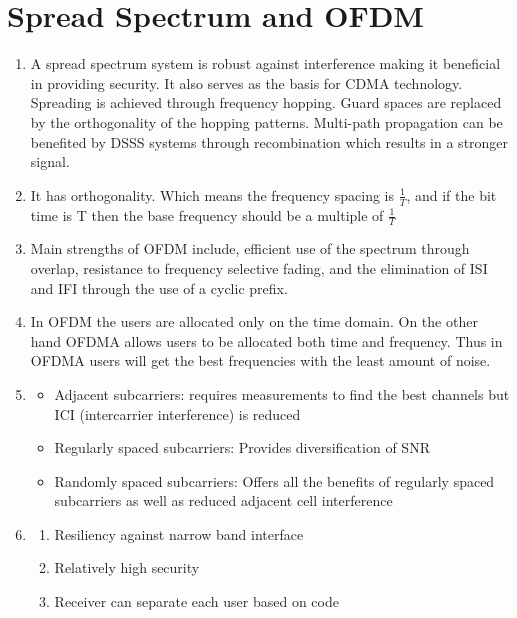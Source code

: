 \documentclass[11pt]{article}
\begin{document}
\section{Spread Spectrum and OFDM}
\begin{enumerate}[label=(\alph*)]
\item {
	A spread spectrum system is robust against interference making it beneficial in providing security. It also serves as the basis
	for CDMA technology. Spreading is achieved through frequency hopping. Guard spaces are replaced by the orthogonality of the 
	hopping patterns. Multi-path propagation can be benefited by DSSS systems through recombination which results in a stronger signal. 
}

\item {
	It has orthogonality. Which means the frequency spacing is $\frac{1}{T}$, and if the bit time is T then the base frequency should be
	a multiple of $\frac{1}{T}$
}

\item {
	Main strengths of OFDM include, efficient use of the spectrum through overlap, resistance to frequency selective fading, 
	and the elimination of ISI and IFI through the use of a cyclic prefix. 

}

\item {
	In OFDM the users are allocated only on the time domain. On the other hand OFDMA allows users to be allocated both time 
	and frequency. Thus in OFDMA users will get the best frequencies with the least amount of noise.
}

\item {
	\begin{itemize} 
	\item {
		Adjacent subcarriers: requires measurements to find the best channels but ICI (intercarrier interference) is reduced 
	}
	
	\item {
		Regularly spaced subcarriers: Provides diversification of SNR
	}
	
	\item {
		Randomly spaced subcarriers: Offers all the benefits of regularly spaced subcarriers as well as reduced adjacent cell interference
	}
	\end{itemize}
} 

\item {
	\begin{enumerate} [label=(\arabic*)]
	
	\item {Resiliency against narrow band interface}
	\item {Relatively high security}
	\item {Receiver can separate each user based on code}
	

\end{enumerate}}
\end{enumerate}
\end{document}
